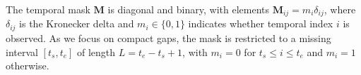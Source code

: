 \documentclass{article}
\begin{document}
The temporal mask $\mathbf{M}$ is diagonal and binary, with elements $\mathbf{M}_{ij} = m_i \delta_{ij}$, where $\delta_{ij}$ is the Kronecker delta and $m_i \in \{0, 1\}$ indicates whether temporal index $i$ is observed.
As we focus on compact gaps, the mask is restricted to a missing interval $[t_s, t_e]$ of length $L = t_e - t_s + 1$, with $m_i = 0$ for $t_s \leq i \leq t_e$ and $m_i = 1$ otherwise.



\end{document}
